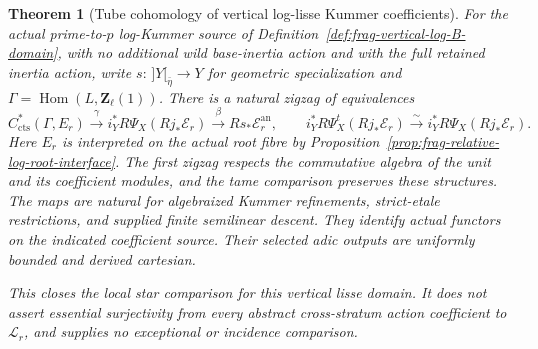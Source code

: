 \documentclass[11pt]{article}
\newtheorem{theorem}{Theorem}[section]
\theoremstyle{definition}
\theoremstyle{remark}
\begin{document}
\begin{theorem}[Tube cohomology of vertical log-lisse Kummer coefficients]
\label{thm:frag-vertical-log-star}
For the actual prime-to-$p$ log-Kummer source of
Definition~\ref{def:frag-vertical-log-B-domain}, with no additional
wild base-inertia action and with the full retained inertia action, write
$s:\,]Y[_{\bar\eta}\to Y$ for geometric specialization and
$\Gamma=\operatorname{Hom}(L,\mathbf Z_\ell(1))$.  There is a natural
zigzag of equivalences
\[
 C^*_{\mathrm{cts}}(\Gamma,E_r)
 \xrightarrow{\ \gamma\ }
 i_Y^*R\Psi_X(Rj_*\mathcal E_r)
 \xrightarrow{\ \beta\ }
 Rs_*\mathcal E_r^{\mathrm{an}},
 \qquad
 i_Y^*R\Psi_X^t(Rj_*\mathcal E_r)
 \xrightarrow{\sim}i_Y^*R\Psi_X(Rj_*\mathcal E_r).
\]
Here $E_r$ is interpreted on the actual root fibre by
Proposition~\ref{prop:frag-relative-log-root-interface}.
The first zigzag respects the commutative algebra of the unit and its
coefficient modules, and the tame comparison preserves these structures.
The maps are natural for algebraized Kummer refinements, strict-etale
restrictions, and supplied finite semilinear descent.  They identify
actual functors on the indicated coefficient source.  Their selected
adic outputs are uniformly bounded and derived cartesian.

This closes the local star comparison for this vertical lisse domain.
It does not assert essential surjectivity from every abstract
cross-stratum action coefficient to $\mathcal L_r$, and supplies no
exceptional or incidence comparison.
\end{theorem}
\end{document}
